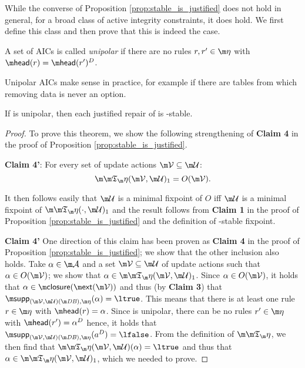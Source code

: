 While the converse of Proposition \ref{prop:stable_is_justified} does not hold in general, for a broad class of active integrity constraints, it does hold. We first define this class and then prove that this is indeed the case. 

\begin{definition}
 A set of AICs \aics is called \emph{unipolar} if there are no rules $r,r'\in\aics$ with $\head(r)=\head(r')^D$. 
\end{definition}

Unipolar AICs make sense in practice, for example if there are tables from which removing data is never an option.


\begin{proposition}\label{prop:justified_is_stable_sometimes}
If \aics is unipolar, then each justified repair of \fulldb is \Ap-stable. 
\end{proposition}
\begin{proof}
 To prove this theorem, we show the following strengthening of \textbf{Claim 4} in the proof of Proposition \ref{prop:stable_is_justified}. 
 \begin{compactdesc}
  \item \textbf{Claim 4'}: For every set of update actions $\VV\subseteq \UU$: 
 \[\Ap(\VV,\UU)_1= {O(\VV)}.\] 
\end{compactdesc}
 It then follows easily that $\UU$ is a minimal fixpoint of $O$ iff $\UU$ is a minimal fixpoint of $\Ap(\cdot,\UU)_1$ and the result follows from \textbf{Claim 1} in the proof of Proposition \ref{prop:stable_is_justified} and the definition of \Ap-stable fixpoint. 
 
\textbf{Claim 4'}
One direction of this claim has been proven as \textbf{Claim 4} in the proof of Proposition \ref{prop:stable_is_justified}; we show that the other inclusion also holds.
 Take $\alpha \in \acts$ and a set $\VV\subseteq\UU$ of update actions such that $\alpha \in {O(\VV)}$; we show that $\alpha\in\Ap(\VV,\UU)_1$. Since $\alpha\in{O(\VV)}$, it holds that $\alpha\in \closure(\ext(\VV))$ and thus (by \textbf{Claim 3}) that $\supp_{(\VV,\UU)(\db),\aics}(\alpha)=\ltrue$. This means that there is at least one rule $r\in\aics$ with $\head(r)=\alpha$. Since \aics is unipolar, there can be no rules $r'\in\aics$ with $\head(r') = \alpha^D$ hence, it holds that $\supp_{(\VV,\UU)(\db),\aics}(a^D)=\lfalse$. From the definition of $\Ap$, we then find that $\Ap(\VV,\UU)(\alpha)=\ltrue$ and thus that  $\alpha\in \Ap(\VV,\UU)_1$, which we needed to prove. 
\qedhere
\end{proof}

